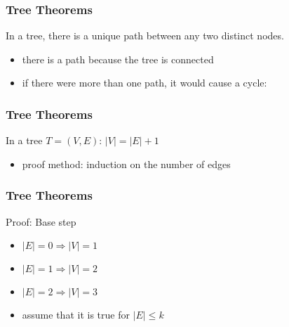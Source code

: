 \documentclass[dvipsnames]{beamer}
\begin{document}
\begin{frame}
  \frametitle{Tree Theorems}

  \begin{theorem}
    In a tree, there is a unique path between any two distinct nodes.
  \end{theorem}

  \begin{itemize}
    \item there is a path because the tree is connected
    \item if there were more than one path, it would cause a cycle:
    \begin{center}
    \end{center}
  \end{itemize}
\end{frame}

\begin{frame}
  \frametitle{Tree Theorems}

  \begin{theorem}
    In a tree $T = (V, E)$: $|V| = |E| + 1$
  \end{theorem}

  \begin{itemize}
    \item proof method: induction on the number of edges
  \end{itemize}
\end{frame}

\begin{frame}
  \frametitle{Tree Theorems}

  \begin{block}{Proof: Base step}
    \begin{itemize}
      \item $|E|=0 \Rightarrow |V|=1$
      \item $|E|=1 \Rightarrow |V|=2$
      \item $|E|=2 \Rightarrow |V|=3$

      \pause
      \medskip
      \item assume that it is true for $|E| \leq k$
    \end{itemize}
  \end{block}
\end{frame}
\end{document}
